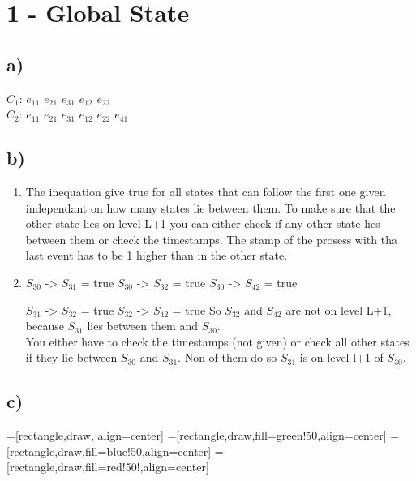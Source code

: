 \documentclass{scrartcl}
\author{Felix Bühler\\2973410 \and Clemens Lieb\\3130838 \and Steffen Wonner\\2862123 \and Fabian Bühler\\2953320}
\title{\gettitle}
\subtitle{\getsubtitle}
\begin{document}
\maketitle

\section*{1 - Global State}
\subsection*{a)}
$C_{1}$: $e_{11}$ $e_{21}$ $e_{31}$ $e_{12}$ $e_{22}$\\
$C_{2}$: $e_{11}$ $e_{21}$ $e_{31}$ $e_{12}$ $e_{22}$ $e_{41}$

\subsection*{b)}
\begin{enumerate}[label=(\roman*)]
\item
The inequation give true for all states that can follow the first one given independant on how many states lie between them. To make sure that the other state lies on level L+1 you can either check if any other state lies between them or check the timestamps. The stamp of the prosess with tha last event has to be 1 higher than in the other state.
\item
$S_{30}$ -> $S_{31}$ = true
$S_{30}$ -> $S_{32}$ = true
$S_{30}$ -> $S_{42}$ = true

$S_{31}$ -> $S_{32}$ = true
$S_{32}$ -> $S_{42}$ = true
So $S_{32}$ and $S_{42}$ are not on level L+1, because $S_{31}$ lies between them and $S_{30}$.\\
You either have to check the timestamps (not given) or check all other states if they lie between $S_{30}$ and $S_{31}$. Non of them do so $S_{31}$ is on level l+1 of $S_{30}$.
\end{enumerate}
\subsection*{c)}

=[rectangle,draw, align=center]
=[rectangle,draw,fill=green!50,align=center]
=[rectangle,draw,fill=blue!50,align=center]
=[rectangle,draw,fill=red!50!,align=center]
\end{document}
